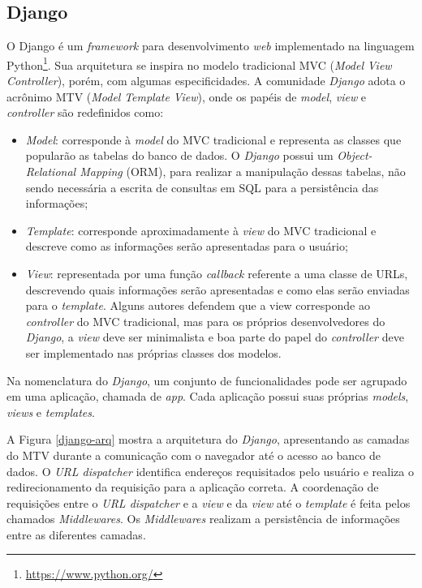     \subsection{Django}
    O Django é um \textit{framework} para desenvolvimento \textit{web} implementado na linguagem Python\footnote{\url{https://www.python.org/}}. Sua arquitetura se inspira no modelo tradicional MVC (\textit{Model} \textit{View} \textit{Controller}), porém, com algumas especificidades. A comunidade \textit{Django} adota o acrônimo MTV (\textit{Model} \textit{Template} \textit{View}), onde os papéis de \textit{model}, \textit{view} e \textit{controller} são redefinidos como:
    \begin{itemize}
        \item \textit{Model}: corresponde à \textit{model} do MVC tradicional e representa as classes que popularão as tabelas do banco de dados. O \textit{Django} possui um \textit{Object-Relational Mapping} (ORM), para realizar a manipulação dessas tabelas, não sendo necessária a escrita de consultas em SQL para a persistência das informações;
        \item \textit{Template}: corresponde aproximadamente à \textit{view} do MVC tradicional e descreve como as informações serão apresentadas para o usuário;
        \item \textit{View}: representada por uma função \textit{callback} referente a uma classe de URLs, descrevendo quais informações serão apresentadas e como elas serão enviadas para o \textit{template}. Alguns autores defendem que a view corresponde ao \textit{controller} do MVC tradicional, mas para os próprios desenvolvedores do \textit{Django}, a \textit{view} deve ser minimalista e boa parte do papel do \textit{controller} deve ser implementado nas próprias classes dos modelos.
    \end{itemize}

    Na nomenclatura do \textit{Django}, um conjunto de funcionalidades pode ser agrupado em uma aplicação, chamada de \textit{app}. Cada aplicação possui suas próprias \textit{models}, \textit{views} e \textit{templates}.

    A Figura \ref{django-arq} mostra a arquitetura do \textit{Django}, apresentando as camadas do MTV durante a comunicação com o navegador até o acesso ao banco de dados. O \textit{URL dispatcher} identifica endereços requisitados pelo usuário e realiza o redirecionamento da requisição para a aplicação correta. A coordenação de requisições entre o \textit{URL dispatcher} e a \textit{view} e da \textit{view} até o \textit{template} é feita pelos chamados \textit{Middlewares}. Os \textit{Middlewares} realizam a persistência de informações entre as diferentes camadas.

